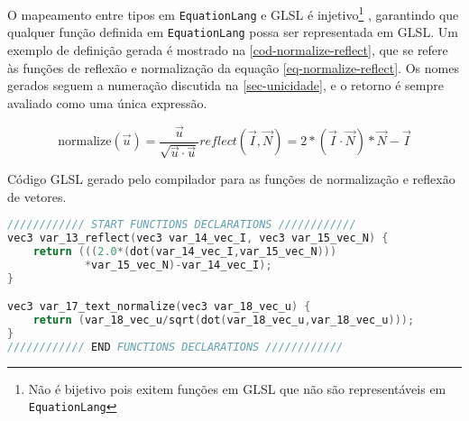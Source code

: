 O mapeamento entre tipos em \texttt{EquationLang} e GLSL é injetivo\footnote{Não é bijetivo pois exitem funções em GLSL que não são representáveis em \texttt{EquationLang}} , garantindo que qualquer função definida em \texttt{EquationLang} possa ser representada em GLSL. Um exemplo de definição gerada é mostrado na \autoref{cod-normalize-reflect}, que se refere às funções de reflexão e normalização da equação \autoref{eq-normalize-reflect}. Os nomes gerados seguem a numeração discutida na \autoref{sec-unicidade}, e o retorno é sempre avaliado como uma única expressão.


\label{eq-normalize-reflect} \begin{subequations}
\begin{equation}
  \text{normalize}(\vec{u}) = \frac{\vec{u}}{\sqrt{\vec{u} \cdot \vec{u}}}
\end{equation}

\begin{equation}
reflect(\vec I, \vec N) =  2*(\vec I \cdot \vec N)*\vec N - \vec I
\end{equation}
\end{subequations}

\begin{codigo}[H]
   \caption{\small Código GLSL gerado pelo compilador para as funções de normalização e reflexão de vetores. }
   \label{cod-normalize-reflect}
\begin{lstlisting}[language=C, inputencoding=utf8]
//////////// START FUNCTIONS DECLARATIONS ////////////
vec3 var_13_reflect(vec3 var_14_vec_I, vec3 var_15_vec_N) {
    return (((2.0*(dot(var_14_vec_I,var_15_vec_N)))
            *var_15_vec_N)-var_14_vec_I);
}

vec3 var_17_text_normalize(vec3 var_18_vec_u) {
    return (var_18_vec_u/sqrt(dot(var_18_vec_u,var_18_vec_u)));
}
//////////// END FUNCTIONS DECLARATIONS ////////////

\end{lstlisting}
\end{codigo}
